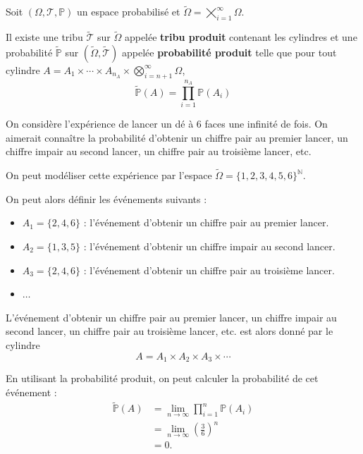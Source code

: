 \documentclass[a4paper, 12pt]{article}
\begin{document}
\begin{theoreme}{}{}
    Soit $(\Omega, \mathcal{T}, \mathbb{P})$ un espace probabilisé et $\tilde{\Omega} = \bigtimes\limits_{i=1}^\infty \Omega$.

    Il existe une tribu $\tilde{\mathcal{T}}$ sur $\tilde{\Omega}$ appelée \textbf{tribu produit} contenant les cylindres et
    une probabilité $\tilde{\mathbb{P}}$ sur $(\tilde{\Omega}, \tilde{\mathcal{T}})$ appelée \textbf{probabilité produit} telle que pour tout cylindre $A = A_1 \times \cdots \times A_{n_A} \times \bigotimes_{i=n+1}^\infty \Omega$,
    $$
    \tilde{\mathbb{P}}(A) = \prod_{i=1}^{n_A} \mathbb{P}(A_i)
    $$
\end{theoreme}

\begin{exemple}
    On considère l'expérience de lancer un dé à 6 faces une infinité de fois. On aimerait connaître la probabilité d'obtenir un chiffre pair au premier lancer, un chiffre impair au second lancer, un chiffre pair au troisième lancer, etc.

    On peut modéliser cette expérience par l'espace $\tilde{\Omega} = \{1, 2, 3, 4, 5, 6\}^\mathbb{N}$.

    On peut alors définir les événements suivants :
    \begin{itemize}
        \item $A_1 = \{2, 4, 6\}$ : l'événement d'obtenir un chiffre pair au premier lancer.
        \item $A_2 = \{1, 3, 5\}$ : l'événement d'obtenir un chiffre impair au second lancer.
        \item $A_3 = \{2, 4, 6\}$ : l'événement d'obtenir un chiffre pair au troisième lancer.
        \item $\ldots$
    \end{itemize}
    L'événement d'obtenir un chiffre pair au premier lancer, un chiffre impair au second lancer, un chiffre pair au troisième lancer, etc. est alors donné par le cylindre
    $$
    A = A_1 \times A_2 \times A_3 \times \cdots
    $$

    En utilisant la probabilité produit, on peut calculer la probabilité de cet événement :
    \begin{align*}
    \tilde{\mathbb{P}}(A) &= \lim_{n \to \infty} \prod_{i=1}^n \mathbb{P}(A_i) \\
    &= \lim_{n \to \infty} \left( \frac{3}{6} \right)^n \\
    &= 0.
    \end{align*}
\end{exemple}
\end{document}

